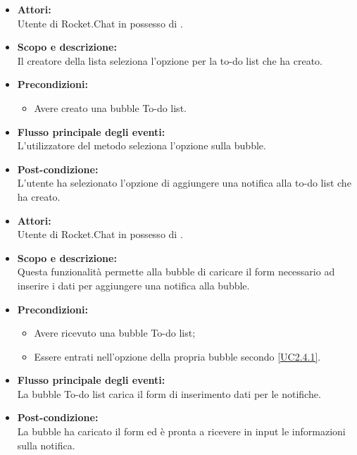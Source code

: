 
\begin{itemize}
	\item \textbf{Attori:}
	\\Utente di Rocket.Chat in possesso di \ProjectName{}.
	\item \textbf{Scopo e descrizione:} 
	\\Il creatore della lista seleziona l'opzione  per la to-do list che ha creato.
	\item \textbf{Precondizioni:}
	\begin{itemize}
		\item Avere creato una bubble To-do list.
	\end{itemize}
	\item \textbf{Flusso principale degli eventi:}
	\\L'utilizzatore del metodo seleziona l'opzione  sulla bubble.
	\item \textbf{Post-condizione:}
	\\L'utente ha selezionato l'opzione di aggiungere una notifica alla to-do list che ha creato.
\end{itemize}


\begin{itemize}
	\item \textbf{Attori:}
	\\Utente di Rocket.Chat in possesso di \ProjectName{}.
	\item \textbf{Scopo e descrizione:} 
	\\Questa funzionalità permette alla bubble di caricare il form necessario ad inserire i dati per aggiungere una notifica alla bubble.
	\item \textbf{Precondizioni:}
	\begin{itemize}
		\item Avere ricevuto una bubble To-do list;
		\item Essere entrati nell'opzione  della propria bubble secondo \ref{UC2.4.1}.
	\end{itemize}
	\item \textbf{Flusso principale degli eventi:}
	\\La bubble To-do list carica il form di inserimento dati per le notifiche.
	\item \textbf{Post-condizione:}
	\\La bubble ha caricato il form ed è pronta a ricevere in input le informazioni sulla notifica.
\end{itemize}

